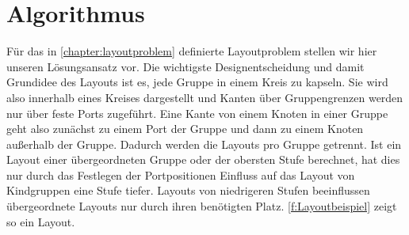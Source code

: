 \chapter{Algorithmus} %
\label{chapter:algo}


Für das in \autoref{chapter:layoutproblem} definierte Layoutproblem stellen wir hier unseren Lösungsansatz vor.
Die wichtigste Designentscheidung und damit Grundidee des Layouts ist es, jede Gruppe in einem Kreis zu kapseln. 
Sie wird also innerhalb eines Kreises dargestellt und Kanten über Gruppengrenzen werden nur über feste Ports zugeführt.
Eine Kante von einem Knoten in einer Gruppe geht also zunächst zu einem Port der Gruppe und dann zu einem Knoten außerhalb der Gruppe.
Dadurch werden die Layouts pro Gruppe getrennt. Ist ein Layout einer übergeordneten Gruppe oder der obersten Stufe berechnet, 
hat dies nur durch das Festlegen der Portpositionen Einfluss auf das Layout von Kindgruppen eine Stufe tiefer. 
Layouts von niedrigeren Stufen beeinflussen übergeordnete Layouts nur durch ihren benötigten Platz.
\autoref{f:Layoutbeispiel} zeigt so ein Layout.


